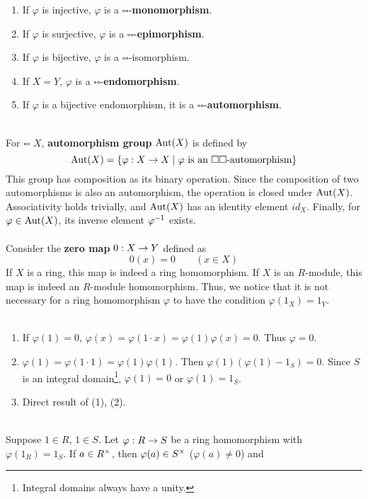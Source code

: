 \begin{enumerate}
	\item If $\varphi$ is injective, $\varphi$ is a $\square\square$-\textbf{monomorphism}.
	\item If $\varphi$ is surjective, $\varphi$ is a $\square\square$-\textbf{epimorphism}.
	\item If $\varphi$ is bijective, $\varphi$ is a $\square\square$-isomorphism.
	\item If $X = Y$, $\varphi$ is a $\square\square$-\textbf{endomorphism}.
	\item If $\varphi$ is a bijective endomorphism, it is a $\square\square$-\textbf{automorphism}.
\end{enumerate}~
\\
 For $\square\square$ $X$, \textbf{automorphism group} $\operatorname{Aut}(X)$ is defined by
$$\operatorname{Aut}(X) = \{\varphi: X\rightarrow X \mid \varphi \text{ is an } \square\square\text{-automorphism}\}$$
This group has composition as its binary operation. Since the composition of two automorphisms is also an automorphism, the operation is closed under $\operatorname{Aut}(X)$. Associativity holds trivially, and $\operatorname{Aut}(X)$ has an identity element $id_X$. Finally, for $\varphi \in \operatorname{Aut}(X)$, its inverse element $\varphi^{-1}$ exists.\\
\\
 Consider the \textbf{zero map} $0:X\rightarrow Y$ defined as $$0(x) = 0 \qquad(x\in X)$$
If $X$ is a ring, this map is indeed a ring homomorphism. If $X$ is an $R$-module, this map is indeed an $R$-module homomorphism. Thus, we notice that it is not necessary for a ring homomorphism $\varphi$ to have the condition $\varphi(1_X)=1_Y$.\\
\\
\begin{enumerate}
	\item If $\varphi(1) = 0$, $\varphi(x) = \varphi(1\cdot x ) = \varphi(1)\varphi(x) = 0$. Thus $\varphi = 0$.
	\item $\varphi(1) = \varphi(1\cdot 1)=\varphi(1)\varphi(1)$. Then $\varphi(1)(\varphi(1)-1_S) = 0$. Since $S$ is an integral domain\footnote{Integral domains always have a unity.}, $\varphi(1) = 0$ or $\varphi(1) = 1_S$.
	\item Direct result of (1), (2).
\end{enumerate}~
\\
 Suppose $1\in R$, $1\in S$. Let $\varphi :R\rightarrow S$ be a ring homomorphism with $\varphi(1_R) = 1_S$. If $a\in R^\times$, then $\varphi(a)\in S^\times$ ($\varphi(a)\neq 0$) and 
